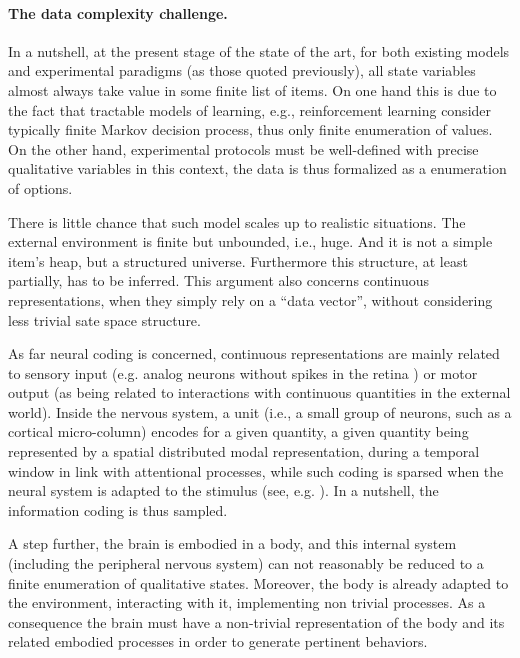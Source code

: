 \documentclass[a4,12pt]{article}
\begin{document}
\paragraph{The data complexity challenge.}

In a nutshell, at the present stage of the state of the art, for both existing models and experimental paradigms (as those quoted previously), all state variables almost always take value in some finite list of items. On one hand this is due to the fact that tractable models of learning, e.g., reinforcement learning \cite{sutton1998reinforcement} consider typically finite Markov decision process, thus only finite enumeration of values. On the other hand, experimental protocols must be well-defined with precise qualitative variables in this context, the data is thus formalized as a enumeration of options. 

There is little chance that such model scales up to realistic situations. The external environment is finite but unbounded, i.e., huge. And it is not a simple item’s heap, but a structured universe. Furthermore this structure, at least partially,  has to be inferred. This argument also concerns continuous representations, when they simply rely on a ``data vector'', without considering less trivial sate space structure.

As far neural coding is concerned, continuous representations are mainly related to sensory input (e.g. analog neurons without spikes in the retina \cite{citeulike:7955297}) or motor output (as being related to interactions with continuous quantities in the external world). Inside the nervous system, a unit (i.e., a small group of neurons, such as a cortical micro-column) encodes for a given quantity, a given quantity being represented by a spatial distributed modal representation, during a temporal window in link with attentional processes, while such coding is sparsed when the neural system is adapted to the stimulus (see, e.g. \cite{citeulike:4194318}). In a nutshell, the information coding is thus sampled.

A step further, the brain is embodied in a body, and this internal system (including the peripheral nervous system) can not reasonably be reduced to a finite enumeration of qualitative states. Moreover, the body is already adapted to the environment, interacting with it, implementing non trivial processes. As a consequence the brain must have a non-trivial representation of the body and its related embodied processes in order to generate pertinent behaviors.
\end{document}
